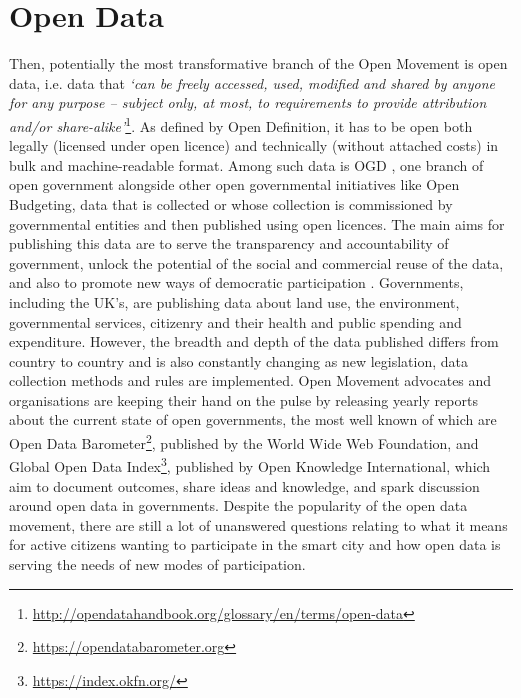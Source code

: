 \section{Open Data}
\label{sec:open-data}
Then, potentially the most transformative branch of the Open Movement is open data, i.e. data that \textit{`can be freely accessed, used, modified and shared by anyone for any purpose -- subject only, at most, to requirements to provide attribution and/or share-alike'}\footnote{\url{http://opendatahandbook.org/glossary/en/terms/open-data}}. As defined by Open Definition, it has to be open both legally (licensed under open licence) and technically (without attached costs) in bulk and machine-readable format. Among such data is OGD \citep{ubaldi_open_2013}, one branch of open government alongside other open governmental initiatives like Open Budgeting, data that is collected or whose collection is commissioned by governmental entities and then published using open licences. The main aims for publishing this data are to serve the transparency and accountability of government, unlock the potential of the social and commercial reuse of the data, and also to promote new ways of democratic participation \citep{jetzek_data-driven_2014}. Governments, including the UK's, are publishing data about land use, the environment, governmental services, citizenry and their health and public spending and expenditure. However, the breadth and depth of the data published differs from country to country and is also constantly changing as new legislation, data collection methods and rules are implemented. Open Movement advocates and organisations are keeping their hand on the pulse by releasing yearly reports about the current state of open governments, the most well known of which are Open Data Barometer\footnote{\url{https://opendatabarometer.org}}, published by the World Wide Web Foundation, and Global Open Data Index\footnote{\url{https://index.okfn.org/}}, published by Open Knowledge International, which aim to document outcomes, share ideas and knowledge, and spark discussion around open data in governments. Despite the popularity of the open data movement, there are still a lot of unanswered questions relating to what it means for active citizens wanting to participate in the smart city and how open data is serving the needs of new modes of participation.

